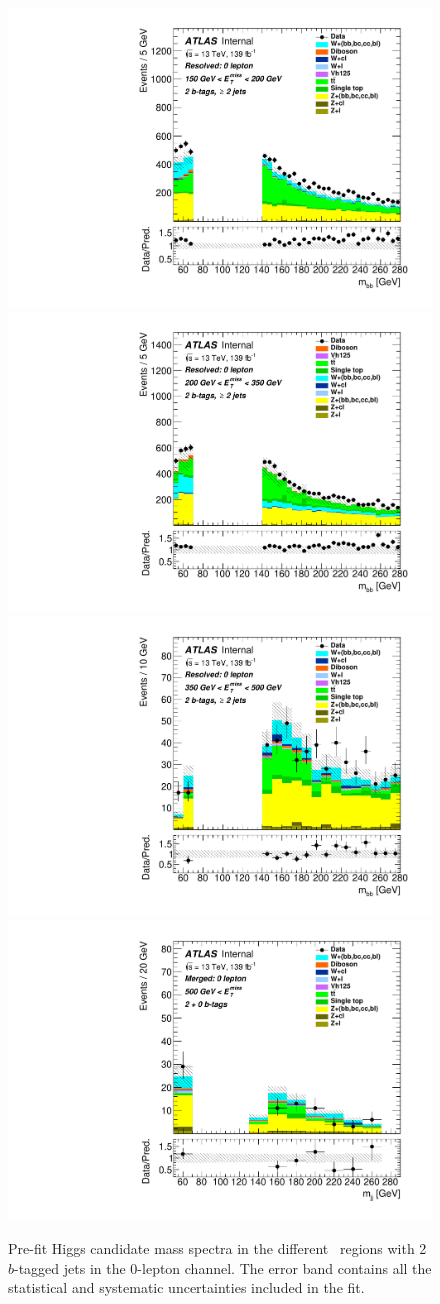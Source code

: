 \begin{figure}[!htb]
  \includegraphics[width=0.46\linewidth]{chapters/c9/figures/Region_distmBB_J2_L0_T2_DSR_Y2015_incJet1_Fat0_incFat1_BMin150_BMax200_Prefit.pdf}
  \includegraphics[width=0.46\linewidth]{chapters/c9/figures/Region_distmBB_J2_L0_T2_DSR_Y2015_incJet1_Fat0_incFat1_BMin200_BMax350_Prefit.pdf}\\
  \includegraphics[width=0.46\linewidth]{chapters/c9/figures/Region_distmBB_J2_L0_T2_DSR_Y2015_incJet1_Fat0_incFat1_BMin350_BMax500_Prefit.pdf}
  \includegraphics[width=0.46\linewidth]{chapters/c9/figures/Region_BMin500_incFat1_Fat1_incJet1_Y2015_DSR_T20_L0_distmBB_J0_Prefit.pdf}
\caption{Pre-fit Higgs candidate mass spectra in the different \met~regions with 2 $b$-tagged jets in the 0-lepton channel. The error band contains all the statistical and systematic uncertainties included in the fit.}
\label{fig:Data_MC_SR_m_jj_2b}
\end{figure}



